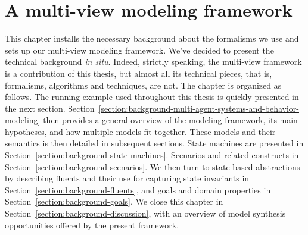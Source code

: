\chapter{A multi-view modeling framework\label{chapter:framework}}

This chapter installs the necessary background about the formalisms we use and sets up our multi-view modeling framework. We've decided to present the technical background \emph{in situ}. Indeed, strictly speaking, the multi-view framework is a contribution of this thesis, but almost all its technical pieces, that is, formalisms, algorithms and techniques, are not. The chapter is organized as follows. The running example used throughout this thesis is quickly presented in the next section. Section~\ref{section:background-multi-agent-systems-and-behavior-modeling} then provides a general overview of the modeling framework, its main hypotheses, and how multiple models fit together. These models and their semantics is then detailed in subsequent sections. State machines are presented in Section~\ref{section:background-state-machines}. Scenarios and related constructs in Section~\ref{section:background-scenarios}. We then turn to state based abstractions by describing fluents and their use for capturing state invariants in Section~\ref{section:background-fluents}, and goals and domain properties in Section~\ref{section:background-goals}. We close this chapter in Section~\ref{section:background-discussion}, with an overview of model synthesis opportunities offered by the present framework.








